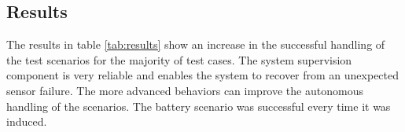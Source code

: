 \documentclass[letterpaper, 10pt, conference]{ieeeconf}
\begin{document}
\subsection{Results}

The results in table \ref{tab:results} show an increase in the successful handling of the test scenarios for the majority of test cases. The system supervision component is very reliable and enables the system to recover from an unexpected sensor failure. The more advanced behaviors can improve the autonomous handling of the scenarios. The battery scenario was successful every time it was induced.

\begin{table}[ht]
	\centering
	\caption{Results}
	\label{tab:results}
	\renewcommand{\arraystretch}{1.5}
\end{table} 
\end{document}
